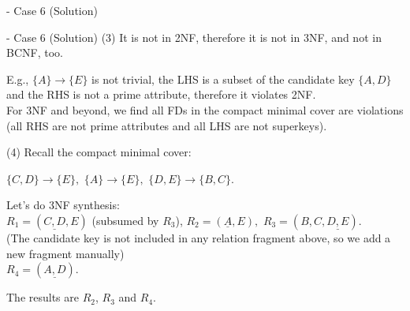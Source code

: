 \begin{frame}[fragile]{ - Case 6 (Solution)}
\end{frame}


\begin{frame}[fragile]{ - Case 6 (Solution)}
	(3)  It is not in 2NF, therefore it is not in 3NF, and not in BCNF, too.\\\vspace{3pt}
	
	E.g., $\{A\} \rightarrow \{E\}$ is not trivial, the LHS is a subset of the candidate key $\{A,D\}$ and the RHS is not a prime attribute, therefore it violates 2NF.\\\vspace{3pt}
	For 3NF and beyond, we find all FDs in the compact minimal cover are violations (all RHS are not prime attributes and all LHS are not superkeys).\\\vspace{5pt}
	
	(4) Recall the compact minimal cover:\\\vspace{3pt}
	
	$\{C,D\} \rightarrow \{E\},$
	$\{A\}  \rightarrow \{E\},$
	$\{D,E\} \rightarrow \{B,C\}.$\\\vspace{3pt}
	
	Let's do 3NF synthesis:\\ \vspace{3pt}
	$R_1 = (\underline{C,D},E)$ (subsumed by $R_3$),
	$R_2 = (\underline{A}, E),$
	$R_3 = (B, C, \underline{D, E}).$\\\vspace{3pt}
	(The candidate key is not included in any relation fragment above, so we add a new fragment manually)\\\vspace{3pt}
	$R_4 = (\underline{A, D}).$\\\vspace{3pt}
	
	The results are $R_2$, $R_3$ and $R_4$.
	

\end{frame}

